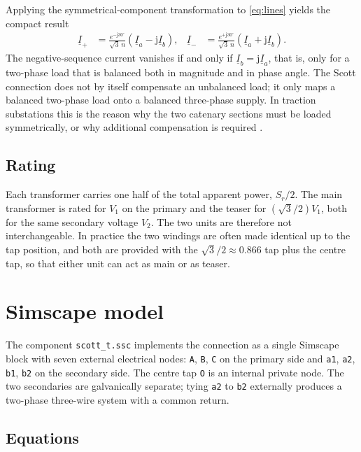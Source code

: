 \documentclass[11pt,a4paper]{article}
\newcommand{\ph}[1]{\underline{#1}}
\begin{document}
Applying the symmetrical-component transformation to \eqref{eq:lines} yields
the compact result
\begin{align}
\ph{I}_{+} &= \frac{e^{-\mathrm{j}30^\circ}}{\sqrt{3}\,n}
              \left(\ph{I}_a - \mathrm{j}\ph{I}_b\right), &
\ph{I}_{-} &= \frac{e^{+\mathrm{j}30^\circ}}{\sqrt{3}\,n}
              \left(\ph{I}_a + \mathrm{j}\ph{I}_b\right).
\label{eq:seq}
\end{align}
The negative-sequence current vanishes if and only if
$\ph{I}_b = \mathrm{j}\ph{I}_a$, that is, only for a two-phase load that is
balanced both in magnitude and in phase angle. The Scott connection does not
by itself compensate an unbalanced load; it only maps a balanced two-phase load
onto a balanced three-phase supply. In traction substations this is the reason
why the two catenary sections must be loaded symmetrically, or why additional
compensation is required \cite{chenguo}.

\subsection*{Rating}

Each transformer carries one half of the total apparent power, $S_r/2$. The
main transformer is rated for $V_1$ on the primary and the teaser for
$(\sqrt{3}/2)V_1$, both for the same secondary voltage $V_2$. The two units are
therefore not interchangeable. In practice the two windings are often made
identical up to the tap position, and both are provided with the
$\sqrt{3}/2 \approx 0.866$ tap plus the centre tap, so that either unit can act
as main or as teaser.

\section{Simscape model}

The component \texttt{scott\_t.ssc} implements the connection as a single
Simscape block with seven external electrical nodes: \texttt{A}, \texttt{B},
\texttt{C} on the primary side and \texttt{a1}, \texttt{a2}, \texttt{b1},
\texttt{b2} on the secondary side. The centre tap \texttt{O} is an internal
private node. The two secondaries are galvanically separate; tying
\texttt{a2} to \texttt{b2} externally produces a two-phase three-wire system
with a common return.

\subsection{Equations}
\end{document}
